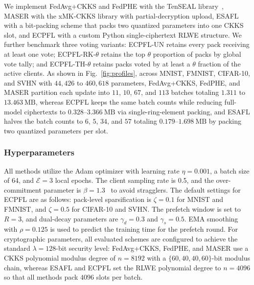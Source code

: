 We implement FedAvg+CKKS and FedPHE with the TenSEAL library~\cite{benaissa2021tenseal}, MASER with the xMK-CKKS library with partial-decryption upload, ESAFL with a bit-packing scheme that packs two quantized parameters into one CKKS slot, and \textsc{ECPFL} with a custom Python single-ciphertext RLWE structure. We further benchmark three voting variants: \textsc{ECPFL-UN} retains every pack receiving at least one vote; \textsc{ECPFL-RK-}$\theta$ retains the top $\theta$ proportion of packs by global vote tally; and \textsc{ECPFL-TH-}$\theta$ retains packs voted by at least a $\theta$ fraction of the active clients. As shown in Fig.~\ref{fig:profiles}, across MNIST, FMNIST, CIFAR-10, and SVHN with $44{,}426$ to $460{,}618$ parameters, FedAvg+CKKS, FedPHE, and MASER partition each update into $11$, $10$, $67$, and $113$ batches totaling $1.311$ to $13.463~\mathrm{MB}$, whereas \textsc{ECPFL} keeps the same batch counts while reducing full-model ciphertexts to $0.328$--$3.366~\mathrm{MB}$ via single-ring-element packing, and \textsc{ESAFL} halves the batch counts to $6$, $5$, $34$, and $57$ totaling $0.179$--$1.698~\mathrm{MB}$ by packing two quantized parameters per slot.

\subsubsection{Hyperparameters}
All methods utilize the Adam optimizer with learning rate $\eta = 0.001$, a batch size of 64, and $\mathcal{E} = 3$ local epochs. The client sampling rate is 0.5, and the over-commitment parameter is $\beta = 1.3$~\cite{yan2025fedfetch} to avoid stragglers. The default settings for \textsc{ECPFL} are as follows: pack-level sparsification is $\zeta = 0.1$ for MNIST and FMNIST, and $\zeta = 0.5$ for CIFAR-10 and SVHN. The prefetch window is set to $R = 3$, and dual-decay parameters are $\gamma_{d} = 0.3$ and $\gamma_{s} = 0.5$. EMA smoothing with $\rho = 0.125$ is used to predict the training time for the prefetch round. For cryptographic parameters, all evaluated schemes are configured to achieve the standard $\lambda = 128$-bit security level: FedAvg+CKKS, FedPHE, and MASER use a CKKS polynomial modulus degree of $n=8192$ with a $\{60, 40, 40, 60\}$-bit modulus chain, whereas \textsc{ESAFL} and \textsc{ECPFL} set the RLWE polynomial degree to $n=4096$ so that all methods pack $4096$ slots per batch.


